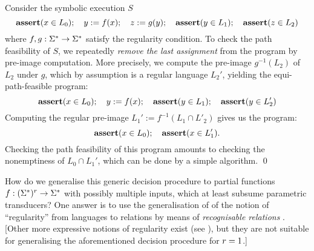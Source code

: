 \begin{example}
    Consider the symbolic execution $S$
    \[
        \textbf{assert}(x \in L_0); \quad y := f(x); \quad z := g(y); 
        \quad \textbf{assert}(y \in L_1); \quad \textbf{assert}(z \in L_2)
    \]
    where $f, g: \Sigma^* \to \Sigma^*$ satisfy the regularity 
    condition. To check the path feasibility of $S$, we repeatedly \emph{remove the last
    assignment} from the program by pre-image computation. More
    precisely, we compute the pre-image $g^{-1}(L_2)$
    of $L_2$ under $g$, which by assumption is a regular language $L_2'$,
    yielding the equi-path-feasible program:
    \[
        \textbf{assert}(x \in L_0); \quad y := f(x); \quad \textbf{assert}(y \in L_1); \quad  \textbf{assert}(y \in L_2') 
    \]
    Computing the regular pre-image $L_1' := f^{-1}(L_1 \cap L'_2)$ gives us
    the program:
    \[
        \textbf{assert}(x \in L_0); \quad \textbf{assert}(x \in L_1').
    \]
%
    Checking the path feasibility of this program amounts to checking the nonemptiness of
    $L_0 \cap L_1'$, which can be done by a simple \FA{} algorithm.
    \qed
\end{example}
How do we generalise this generic decision procedure to partial functions $f: 
(\Sigma^*)^r \to \Sigma^*$ with possibly multiple inputs, which at least
subsume parametric transducers? 
One answer is to use the generalisation of
of the notion of ``regularity'' from languages to relations 
by means of \emph{recognisable relations} \cite{choffrut-survey}.
[Other more expressive notions of regularity exist (see \cite{choffrut-survey}),
but they are not suitable for generalising the aforementioned decision
procedure for $r=1$.]
%

